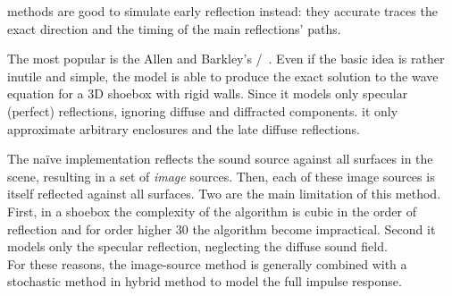  methods are good to simulate early reflection instead:
they accurate traces the exact direction and the timing of the main reflections' paths.

The most popular is the Allen and Barkley's \ISMdef/~.
Even if the basic idea is rather inutile and simple, the model is able to produce the exact solution to the wave equation for a 3D shoebox with rigid walls.
Since it models only specular (perfect) reflections, ignoring diffuse and diffracted components.
it only approximate arbitrary enclosures and the late diffuse reflections.

The na\"ive implementation reflects the sound source against all surfaces in the scene, resulting in a set of \textit{image} sources.
Then, each of these image sources is itself reflected against all surfaces.
Two are the main limitation of this method.
First, in a shoebox the complexity of the algorithm is cubic in the order of reflection and for order higher 30 the algorithm become impractical.
Second it models only the specular reflection, neglecting the diffuse sound field.
\\For these reasons, the image-source method is generally combined with a stochastic method in hybrid method to model the full impulse response.

